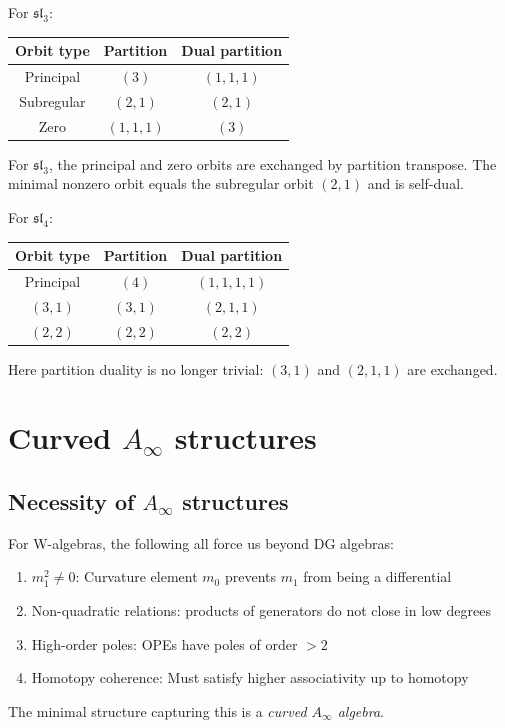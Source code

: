 \begin{example}
For $\mathfrak{sl}_3$:
\begin{center}
\begin{tabular}{c|c|c}
Orbit type & Partition & Dual partition \\
\hline
Principal & $(3)$ & $(1,1,1)$ \\
Subregular & $(2,1)$ & $(2,1)$ \\
Zero & $(1,1,1)$ & $(3)$
\end{tabular}
\end{center}

For $\mathfrak{sl}_3$, the principal and zero orbits are exchanged by partition transpose.
The minimal nonzero orbit equals the subregular orbit $(2,1)$ and is self-dual.

For $\mathfrak{sl}_4$:
\begin{center}
\begin{tabular}{c|c|c}
Orbit type & Partition & Dual partition \\
\hline
Principal & $(4)$ & $(1,1,1,1)$ \\
$(3,1)$ & $(3,1)$ & $(2,1,1)$ \\
$(2,2)$ & $(2,2)$ & $(2,2)$
\end{tabular}
\end{center}

Here partition duality is no longer trivial: $(3,1)$ and $(2,1,1)$ are exchanged.
\end{example}

\section{\texorpdfstring{Curved $A_\infty$ structures}{Curved A infty structures}}

\subsection{\texorpdfstring{Necessity of $A_\infty$ structures}{Necessity of A infty structures}}

\begin{remark}
For W-algebras, the following all force us beyond DG algebras:
\begin{enumerate}
\item $m_1^2 \neq 0$: Curvature element $m_0$ prevents $m_1$ from being a differential
\item Non-quadratic relations: products of generators do not close in low degrees
\item High-order poles: OPEs have poles of order $> 2$
\item Homotopy coherence: Must satisfy higher associativity up to homotopy
\end{enumerate}

The minimal structure capturing this is a \emph{curved $A_\infty$ algebra}.
\end{remark}

